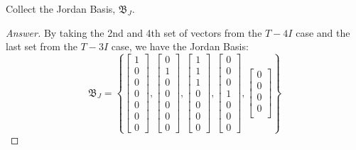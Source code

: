 \documentclass{article}
\newcommand{\bracks}[1]{\left\{#1\right\}}
\newcommand{\sqbracks}[1]{\left[#1\right]}
\begin{document}
            \item Collect the Jordan Basis, $\mathfrak{B}_J$.
            \begin{proof}[Answer]
            By taking the 2nd and 4th set of vectors from the $T-4I$ case and
            the last set from the $T-3I$ case, we have the Jordan Basis:
            $$\mathfrak{B}_J = 
            \bracks{\sqbracks{\begin{matrix}
            1 \\
            0 \\
            0 \\
            0 \\
            0 \\
            0 \\
            0 
            \end{matrix}}, \sqbracks{\begin{matrix}
            0 \\
            1 \\
            0 \\
            0 \\
            0 \\
            0 \\
            0 
            \end{matrix}}, \sqbracks{\begin{matrix}
            1 \\
            1 \\
            1 \\
            0 \\
            0 \\
            0 \\
            0 
            \end{matrix}}, \sqbracks{\begin{matrix}
            0 \\
            0 \\
            0 \\
            1 \\
            0 \\
            0 \\
            0 
            \end{matrix}},\sqbracks{\begin{matrix}
            0 \\
            0 \\
            0 \\
            0 \\

\end{matrix}}}$$
\end{proof}
\end{document}
